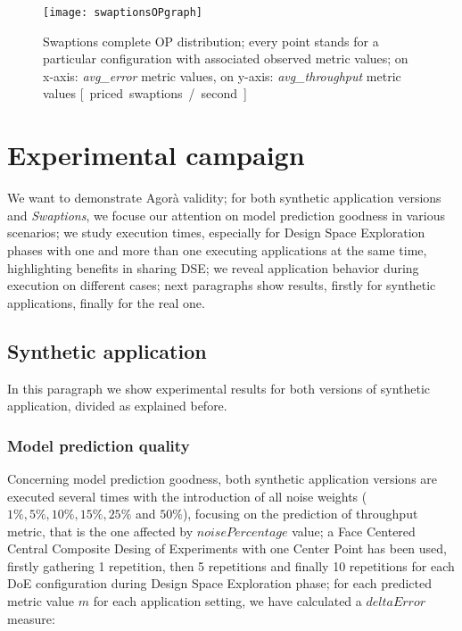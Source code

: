 \begin{figure}[H]

    \centering
    \texttt{[image: swaptionsOPgraph]}
    \caption[Swaptions complete OP distribution]{Swaptions complete OP distribution; every point stands for a particular configuration with associated observed metric values; on x-axis: \textit{avg\_error} metric values, on y-axis: \textit{avg\_throughput} metric values \hbox{[ priced swaptions / second ]}}
    \label{fig::swaptionsOPs}
    
\end{figure}





\section{Experimental campaign}\label{campaign}

We want to demonstrate Agorà validity; for both synthetic application versions and \textit{Swaptions}, we focuse our attention on model prediction goodness in various scenarios; we study execution times, especially for Design Space Exploration phases with one and more than one executing applications at the same time, highlighting benefits in sharing DSE; we reveal application behavior during execution on different cases; next paragraphs show results, firstly for synthetic applications, finally for the real one.


\subsection{Synthetic application}

In this paragraph we show experimental results for both versions of synthetic application, divided as explained before.


\subsubsection{Model prediction quality}\label{deltaErrorExplanation}

Concerning model prediction goodness, both synthetic application versions are executed several times with the introduction of all noise weights ($1\%, 5\%, 10\%, 15\%, 25\%$ and $50\%$), focusing on the prediction of throughput metric, that is the one affected by $noisePercentage$ value; a Face Centered Central Composite Desing of Experiments with one Center Point has been used, firstly gathering 1 repetition, then 5 repetitions and finally 10 repetitions for each DoE configuration during Design Space Exploration phase; for each predicted metric value $m$ for each application setting, we have calculated a $deltaError$ measure:

